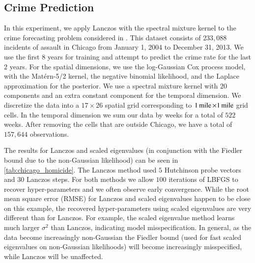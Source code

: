 \subsection{Crime Prediction}

In this experiment, we apply Lanczos with the spectral mixture kernel to the
crime forecasting problem considered in \cite{flaxman2015fast}. This dataset
consists of $233,088$ incidents of assault in Chicago from January 1, 2004 to
December 31, 2013. We use the first $8$ years for training and attempt to
predict the crime rate for the last $2$ years. For the spatial dimensions, we
use the log\hyp{}Gaussian Cox process model, with the Mat\'ern\hyp{}5/2 kernel,
the negative binomial likelihood, and the Laplace approximation for the
posterior. We use a spectral mixture kernel with $20$ components and an extra
constant component for the temporal dimension. We discretize the data into a $17
\times 26$ spatial grid corresponding to $1\operatorname{mile}\mathbin{\times}1\operatorname{mile}$ grid cells. In
the temporal dimension we sum our data by weeks for a total of $522$ weeks.
After removing the cells that are outside Chicago, we have a total of $157,644$
observations.

The results for Lanczos and scaled eigenvalues (in conjunction with the Fiedler
bound due to the non\hyp{}Gaussian likelihood) can be seen in 
\cref{tab:chicago_homicide}. The Lanczos method used $5$ Hutchinson probe vectors
and $30$ Lanczos steps. For both methods we allow $100$ iterations of LBFGS to
recover hyper\hyp{}parameters and we often observe early convergence. While the
root mean square error (RMSE) for Lanczos and scaled eigenvalues happen to be
close on this example, the recovered hyper\hyp{}parameters using scaled
eigenvalues are very different than for Lanczos. For example, the scaled
eigenvalue method learns much larger $\sigma^2$ than Lanczos, indicating model
misspecification. In general, as the data become increasingly non\hyp{}Gaussian
the Fiedler bound (used for fast scaled eigenvalues on non\hyp{}Gaussian
likelihoods) will become increasingly misspecified, while Lanczos will be
unaffected.

